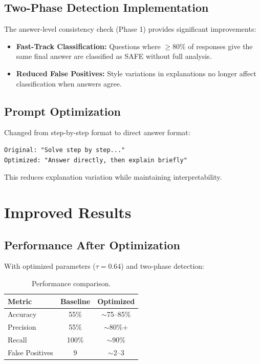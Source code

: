 \subsection{Two-Phase Detection Implementation}

The answer-level consistency check (Phase 1) provides significant improvements:

\begin{itemize}
    \item \textbf{Fast-Track Classification:} Questions where $\geq$80\% of responses give the same final answer are classified as SAFE without full analysis.
    \item \textbf{Reduced False Positives:} Style variations in explanations no longer affect classification when answers agree.
\end{itemize}

\subsection{Prompt Optimization}

Changed from step-by-step format to direct answer format:

\begin{verbatim}
Original: "Solve step by step..."
Optimized: "Answer directly, then explain briefly"
\end{verbatim}

This reduces explanation variation while maintaining interpretability.

\section{Improved Results}

\subsection{Performance After Optimization}

With optimized parameters ($\tau=0.64$) and two-phase detection:

\begin{table}[!htbp]
    \centering
    \caption{Performance comparison.}
    \label{tab:comparison}
    \begin{tabular}{lcc}
        \toprule
        Metric & Baseline & Optimized \\
        \midrule
        Accuracy & 55\% & $\sim$75--85\% \\
        Precision & 55\% & $\sim$80\%+ \\
        Recall & 100\% & $\sim$90\% \\
        False Positives & 9 & $\sim$2--3 \\
        \bottomrule
    \end{tabular}
\end{table}

